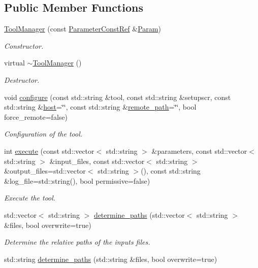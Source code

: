 \subsection*{Public Member Functions}
\begin{DoxyCompactItemize}
\item 
\hyperlink{classToolManager_a213dc23b5dc57354857053ef0b0c3fa8}{Tool\+Manager} (const \hyperlink{Parameter_8hpp_a37841774a6fcb479b597fdf8955eb4ea}{Parameter\+Const\+Ref} \&\hyperlink{classToolManager_ae9a9aa4672305bbf4ce1f28d4472b0eb}{Param})
\begin{DoxyCompactList}\small\item\em Constructor. \end{DoxyCompactList}\item 
virtual \hyperlink{classToolManager_a242d9f322f17b81946a921764ea6c5dd}{$\sim$\+Tool\+Manager} ()
\begin{DoxyCompactList}\small\item\em Destructor. \end{DoxyCompactList}\item 
void \hyperlink{classToolManager_abc49a9ba19dbcea87407517f7f746d1d}{configure} (const std\+::string \&tool, const std\+::string \&setupscr, const std\+::string \&\hyperlink{classToolManager_a08d743e6d2aa5bfe5917130574d06a87}{host}=\char`\"{}\char`\"{}, const std\+::string \&\hyperlink{classToolManager_a01d51d439d7326cd32b06fe3c43f04ae}{remote\+\_\+path}=\char`\"{}\char`\"{}, bool force\+\_\+remote=false)
\begin{DoxyCompactList}\small\item\em Configuration of the tool. \end{DoxyCompactList}\item 
int \hyperlink{classToolManager_a30f0f9fac713b19600315938cb211a87}{execute} (const std\+::vector$<$ std\+::string $>$ \&parameters, const std\+::vector$<$ std\+::string $>$ \&input\+\_\+files, const std\+::vector$<$ std\+::string $>$ \&output\+\_\+files=std\+::vector$<$ std\+::string $>$(), const std\+::string \&log\+\_\+file=std\+::string(), bool permissive=false)
\begin{DoxyCompactList}\small\item\em Execute the tool. \end{DoxyCompactList}\item 
std\+::vector$<$ std\+::string $>$ \hyperlink{classToolManager_a7973f93d141a5e61f42cf681c97c59e5}{determine\+\_\+paths} (std\+::vector$<$ std\+::string $>$ \&files, bool overwrite=true)
\begin{DoxyCompactList}\small\item\em Determine the relative paths of the inputs files. \end{DoxyCompactList}\item 
std\+::string \hyperlink{classToolManager_a0df8be838f09893c5eaefe22841b23b8}{determine\+\_\+paths} (std\+::string \&files, bool overwrite=true)
\end{DoxyCompactItemize}
